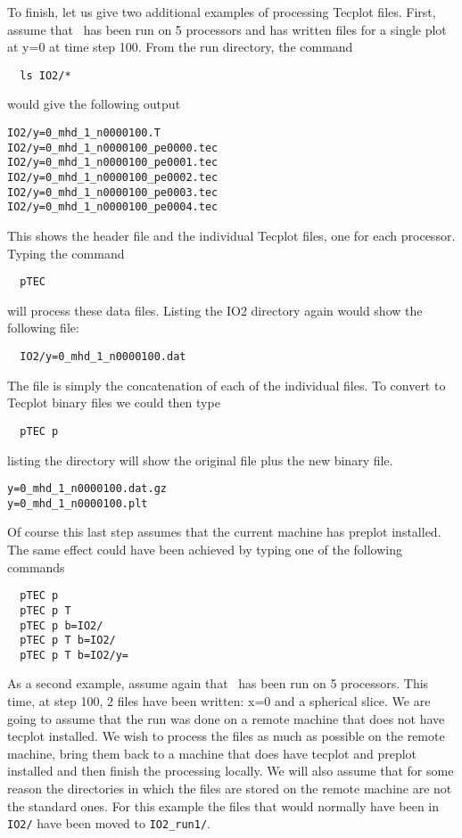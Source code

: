 To finish, let us give two additional examples of processing Tecplot
files.  First, assume that \BATSRUS\ has been run on 5 processors and
has written files for a single plot at y=0 at time step 100.  From the
run directory, the command
\begin{verbatim}
  ls IO2/*
\end{verbatim}
would give the following output
\begin{verbatim}
IO2/y=0_mhd_1_n0000100.T
IO2/y=0_mhd_1_n0000100_pe0000.tec
IO2/y=0_mhd_1_n0000100_pe0001.tec
IO2/y=0_mhd_1_n0000100_pe0002.tec
IO2/y=0_mhd_1_n0000100_pe0003.tec
IO2/y=0_mhd_1_n0000100_pe0004.tec
\end{verbatim}
This shows the header file and the individual Tecplot files, one for
each processor.  Typing the command
\begin{verbatim}
  pTEC
\end{verbatim}
will process these data files.  Listing the IO2 directory again would
show the following file:
\begin{verbatim}
  IO2/y=0_mhd_1_n0000100.dat
\end{verbatim}
The file is simply the concatenation of each of the individual files.
To convert to Tecplot binary files we could then type
\begin{verbatim}
  pTEC p
\end{verbatim}
listing the directory will show the original file plus the new binary file.
\begin{verbatim}
y=0_mhd_1_n0000100.dat.gz  
y=0_mhd_1_n0000100.plt
\end{verbatim}
Of course this last step assumes that the current machine has preplot 
installed. The same effect could have been achieved by typing one of 
the following commands
\begin{verbatim}
  pTEC p
  pTEC p T
  pTEC p b=IO2/
  pTEC p T b=IO2/
  pTEC p T b=IO2/y=
\end{verbatim}
As a second example, assume again that \BATSRUS\ has been run on 5
processors.  This time, at step 100, 2 files have been written: x=0 and a
spherical slice.  We are going to assume that the
run was done on a remote machine that does not have tecplot installed.
We wish to process the files as much as possible on the remote machine,
bring them back to a machine that does have tecplot and preplot
installed and then finish the processing locally.  We will also assume
that for some reason the directories in which the files are stored on
the remote machine are not the standard ones.  For this example 
the files that would normally have been in {\tt IO2/} have been moved to 
{\tt IO2\_run1/}. 

